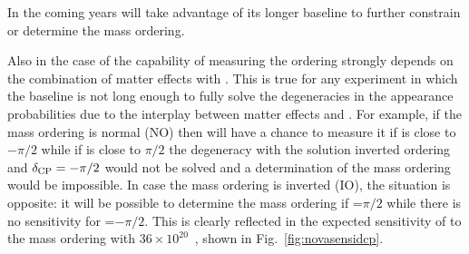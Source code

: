 In the coming years \nova will take advantage  of its longer baseline to further constrain or determine the mass ordering. 

%
%
Also in the case of \nova the capability of measuring the ordering strongly depends on the combination of matter effects with \dcp. This is true for any experiment in which the baseline is not long enough to fully solve the degeneracies in the appearance probabilities due to the interplay between matter effects and \dcp. 
For example, if the mass ordering is normal (NO) then \nova will have a chance to measure it if \dcp is close to $-\pi/2$ while if \dcp is close to $\pi/2$ the degeneracy with the solution inverted ordering and $\delta_{\mathrm{CP}}=-\pi/2$ would not be solved and a determination of the mass ordering would be impossible. In case the mass ordering is inverted (IO), the situation is opposite: it will be possible to determine the mass ordering if \dcp=$\pi/2$ while there is no sensitivity for \dcp=$-\pi/2$. This is clearly reflected in the expected sensitivity of \nova to the mass ordering with $36\times10^{20}$~\pot, shown in Fig.~\ref{fig:novasensidcp}.

